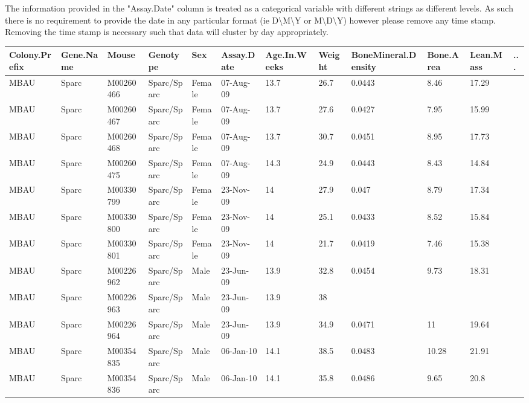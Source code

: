 \documentclass[12pt,a4paper]{article}
\begin{document}
The information provided in the "Assay.Date" column is treated as a categorical variable with different strings as different levels.  As such there is no requirement to provide the date in any particular format (ie D\textbackslash M\textbackslash Y or M\textbackslash D\textbackslash Y) however please remove any time stamp.  Removing the time stamp is necessary such that data will cluster by day appropriately.
\begin{table}
 \begin{tabular}{| p{13mm} | p{13mm} | l | l | l | p{19mm}| p{12mm} | l | p{13mm} | p{12mm} | p{12mm} | l |}
  \hline
Colony.\newline Prefix&Gene.\newline Name&Mouse&\textbf{Genotype}&\textbf{Sex}&\textbf{Assay.\newline Date}&Age.In.\newline Weeks&\textbf{Weight}&Bone\newline Mineral.\newline Density&Bone.\newline Area&Lean.\newline Mass& ... \\\hline
MBAU&Sparc&M00260466&Sparc/Sparc&Female&07-Aug-09&13.7&26.7&0.0443&8.46&17.29&\\
MBAU&Sparc&M00260467&Sparc/Sparc&Female&07-Aug-09&13.7&27.6&0.0427&7.95&15.99&\\
MBAU&Sparc&M00260468&Sparc/Sparc&Female&07-Aug-09&13.7&30.7&0.0451&8.95&17.73&\\
MBAU&Sparc&M00260475&Sparc/Sparc&Female&07-Aug-09&14.3&24.9&0.0443&8.43&14.84&\\
MBAU&Sparc&M00330799&Sparc/Sparc&Female&23-Nov-09&14&27.9&0.047&8.79&17.34&\\
MBAU&Sparc&M00330800&Sparc/Sparc&Female&23-Nov-09&14&25.1&0.0433&8.52&15.84&\\
MBAU&Sparc&M00330801&Sparc/Sparc&Female&23-Nov-09&14&21.7&0.0419&7.46&15.38&\\
MBAU&Sparc&M00226962&Sparc/Sparc&Male&23-Jun-09&13.9&32.8&0.0454&9.73&18.31&\\
MBAU&Sparc&M00226963&Sparc/Sparc&Male&23-Jun-09&13.9&38&&&&\\
MBAU&Sparc&M00226964&Sparc/Sparc&Male&23-Jun-09&13.9&34.9&0.0471&11&19.64&\\
MBAU&Sparc&M00354835&Sparc/Sparc&Male&06-Jan-10&14.1&38.5&0.0483&10.28&21.91&\\
MBAU&Sparc&M00354836&Sparc/Sparc&Male&06-Jan-10&14.1&35.8&0.0486&9.65&20.8&\\

\end{tabular}
\end{table}
\end{document}
